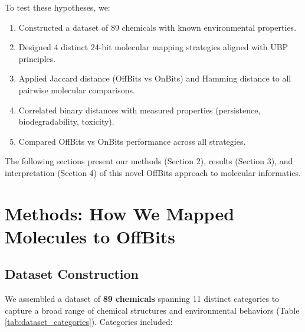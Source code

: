 \documentclass[11pt,letterpaper]{article}
\begin{document}
To test these hypotheses, we:
\begin{enumerate}
    \item Constructed a dataset of 89 chemicals with known environmental properties.
    \item Designed 4 distinct 24-bit molecular mapping strategies aligned with UBP principles.
    \item Applied Jaccard distance (OffBits vs OnBits) and Hamming distance to all pairwise molecular comparisons.
    \item Correlated binary distances with measured properties (persistence, biodegradability, toxicity).
    \item Compared OffBits vs OnBits performance across all strategies.
\end{enumerate}

The following sections present our methods (Section 2), results (Section 3), and interpretation (Section 4) of this novel OffBits approach to molecular informatics.

\section{Methods: How We Mapped Molecules to OffBits}

\subsection{Dataset Construction}

We assembled a dataset of \textbf{89 chemicals} spanning 11 distinct categories to capture a broad range of chemical structures and environmental behaviors (Table \ref{tab:dataset_categories}). Categories included:
\end{document}
